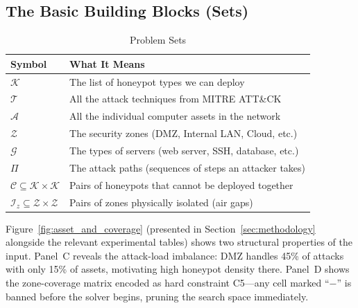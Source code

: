 \documentclass[journal]{IEEEtran}
\newcommand{\calK}{\mathcal{K}}
\newcommand{\calT}{\mathcal{T}}
\newcommand{\calA}{\mathcal{A}}
\newcommand{\calZ}{\mathcal{Z}}
\newcommand{\calG}{\mathcal{G}}
\newcommand{\calC}{\mathcal{C}}
\newcommand{\calPi}{\mathcal{\Pi}}
\begin{document}
\subsection{The Basic Building Blocks (Sets)}

\begin{table}[htbp]
\caption{Problem Sets}
\label{tab:sets}
\centering
\renewcommand{\arraystretch}{1.2}
\begin{tabular}{@{}ll@{}}
\toprule
\textbf{Symbol} & \textbf{What It Means} \\
\midrule
$\calK$ & The list of honeypot types we can deploy \\
$\calT$ & All the attack techniques from MITRE ATT\&CK \\
$\calA$ & All the individual computer assets in the network \\
$\calZ$ & The security zones (DMZ, Internal LAN, Cloud, etc.) \\
$\calG$ & The types of servers (web server, SSH, database, etc.) \\
$\calPi$ & The attack paths (sequences of steps an attacker takes) \\
$\calC \subseteq \calK \times \calK$ &
  Pairs of honeypots that cannot be deployed together \\
$\mathcal{I}_z \subseteq \calZ \times \calZ$ &
  Pairs of zones physically isolated (air gaps) \\
\bottomrule
\end{tabular}
\end{table}

Figure~\ref{fig:asset_and_coverage} (presented in
Section~\ref{sec:methodology} alongside the relevant
experimental tables) shows two structural properties of the
input.
Panel~C reveals the attack-load imbalance: DMZ handles 45\%
of attacks with only 15\% of assets, motivating high honeypot
density there.
Panel~D shows the zone-coverage matrix encoded as hard
constraint C5---any cell marked ``$-$'' is banned before the
solver begins, pruning the search space immediately.
\end{document}
